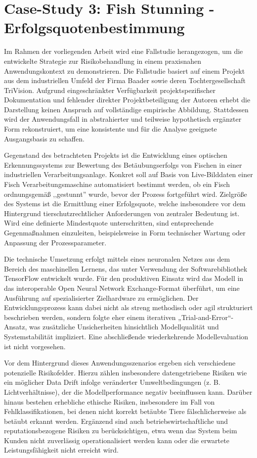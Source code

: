 \section{Case-Study 3: Fish Stunning - Erfolgsquotenbestimmung} 
\label{sec:case_study_3}
Im Rahmen der vorliegenden Arbeit wird eine Fallstudie herangezogen, 
um die entwickelte Strategie zur Risikobehandlung in einem praxisnahen Anwendungskontext zu demonstrieren. 
Die Fallstudie basiert auf einem Projekt aus dem industriellen Umfeld der 
Firma Baader sowie deren Tochtergesellschaft TriVision. 
Aufgrund eingeschränkter Verfügbarkeit projektspezifischer Dokumentation 
und fehlender direkter Projektbeteiligung der Autoren erhebt die Darstellung
keinen Anspruch auf vollständige empirische Abbildung. 
Stattdessen wird der Anwendungsfall in abstrahierter und teilweise 
hypothetisch ergänzter Form rekonstruiert, um eine konsistente und für die Analyse geeignete Ausgangsbasis zu schaffen.

Gegenstand des betrachteten Projekts ist die Entwicklung eines 
optischen Erkennungssystems zur Bewertung des Betäubungserfolgs von Fischen 
in einer industriellen Verarbeitungsanlage. 
Konkret soll auf Basis von Live-Bilddaten einer Fisch Verarbeitungsmaschine automatisiert bestimmt werden, 
ob ein Fisch ordnungsgemäß ,,gestunnt'' wurde, bevor der Prozess fortgeführt wird. Zielgröße des Systems ist die Ermittlung einer Erfolgsquote, 
welche insbesondere vor dem Hintergrund tierschutzrechtlicher Anforderungen von zentraler Bedeutung ist. 
Wird eine definierte Mindestquote unterschritten, sind entsprechende Gegenmaßnahmen einzuleiten, 
beispielsweise in Form technischer Wartung oder Anpassung der Prozessparameter.

Die technische Umsetzung erfolgt mittels eines neuronalen Netzes aus
dem Bereich des maschinellen Lernens, das unter Verwendung der Softwarebibliothek TensorFlow entwickelt wurde.
Für den produktiven Einsatz wird das Modell in das interoperable Open Neural Network Exchange-Format überführt, 
um eine Ausführung auf spezialisierter Zielhardware zu ermöglichen. 
Der Entwicklungsprozess kann dabei nicht als streng methodisch oder agil strukturiert beschrieben werden, 
sondern folgte eher einem iterativen „Trial-and-Error“-Ansatz, was zusätzliche Unsicherheiten 
hinsichtlich Modellqualität und Systemstabilität impliziert. Eine abschließende wiederkehrende 
Modellevaluation ist nicht vorgesehen.

Vor dem Hintergrund dieses Anwendungsszenarios ergeben sich verschiedene potenzielle Risikofelder. 
Hierzu zählen insbesondere datengetriebene Risiken wie ein möglicher 
Data Drift infolge veränderter Umweltbedingungen (z. B. Lichtverhältnisse), der die Modellperformance 
negativ beeinflussen kann. Darüber hinaus bestehen erhebliche ethische Risiken, 
insbesondere im Fall von Fehlklassifikationen, bei denen nicht korrekt betäubte Tiere fälschlicherweise 
als betäubt erkannt werden. Ergänzend sind auch betriebswirtschaftliche und reputationsbezogene Risiken 
zu berücksichtigen, etwa wenn das System beim Kunden nicht zuverlässig operationalisiert 
werden kann oder die erwartete Leistungsfähigkeit nicht erreicht wird.

